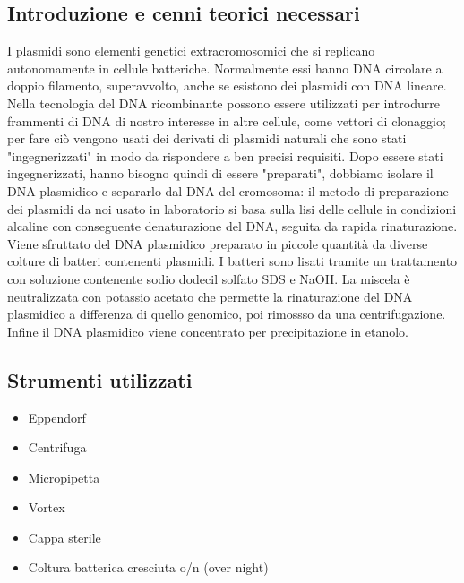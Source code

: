 \documentclass{extarticle}
\begin{document}
\subsection*{Introduzione e cenni teorici necessari} I plasmidi sono elementi genetici extracromosomici che si replicano autonomamente in cellule batteriche. Normalmente essi hanno DNA circolare a doppio filamento, superavvolto, anche se esistono dei plasmidi con DNA lineare.\\Nella tecnologia del DNA ricombinante possono essere utilizzati per introdurre frammenti di DNA di nostro interesse in altre cellule, come vettori di clonaggio; per fare ciò vengono usati dei derivati di plasmidi naturali che sono
stati "ingegnerizzati" in modo da rispondere a ben precisi requisiti. 
Dopo essere stati ingegnerizzati, hanno bisogno quindi di essere "preparati", dobbiamo isolare il DNA plasmidico e separarlo dal DNA del cromosoma: il metodo di preparazione dei plasmidi da noi usato in laboratorio si basa sulla lisi delle cellule in condizioni alcaline con conseguente denaturazione del DNA, seguita da rapida rinaturazione. Viene sfruttato del DNA plasmidico preparato in piccole quantità da diverse colture di batteri contenenti plasmidi. I batteri sono lisati tramite un trattamento con soluzione contenente sodio dodecil solfato SDS e NaOH. La miscela è neutralizzata con potassio acetato che permette la rinaturazione del DNA plasmidico a differenza di quello genomico, poi rimossso da una centrifugazione. Infine il DNA plasmidico viene concentrato per precipitazione in etanolo.
\subsection*{Strumenti utilizzati}

\begin{minipage}{0.5\textwidth}
    \begin{itemize}
        \item Eppendorf
        \item Centrifuga
        \item Micropipetta
    \end{itemize}
\end{minipage} \hfill
\begin{minipage}{0.50\textwidth} 
    \begin{itemize}
        \item Vortex
        \item Cappa sterile
        \item Coltura batterica cresciuta o/n (over night)
 \end{itemize}
\end{minipage}
\end{document}
